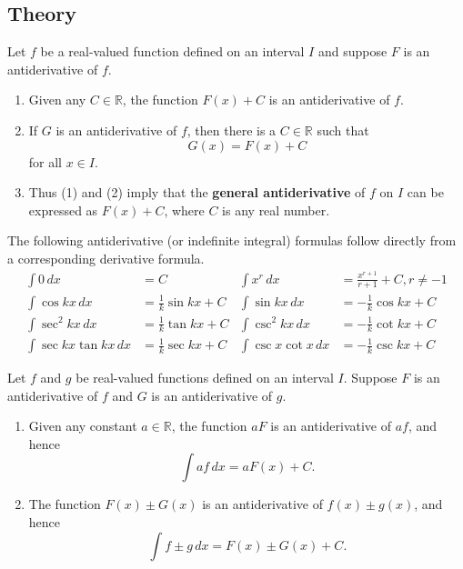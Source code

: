  \subsection*{Theory}
\begin{namedtheorem} Let $f$ be a real-valued function defined on an interval $I$ and suppose $F$ is an antiderivative of $f$.
  \begin{enumerate}[itemsep=0pt, topsep=0pt]
    \item Given any $C\in \mathbb{R}$, the function $F(x)+C$ is an antiderivative of $f$.
    \item If $G$ is an antiderivative of $f$, then there is a $C\in \mathbb{R}$ such that
    \[
    G(x)=F(x)+C
    \]
    for all $x\in I$.
    \item Thus (1) and (2) imply that the {\bf general antiderivative} of $f$ on $I$ can be expressed as $F(x)+C$, where $C$ is any real number.
  \end{enumerate}

\end{namedtheorem}
\begin{namedtheorem} The following antiderivative (or indefinite integral) formulas follow directly from a corresponding derivative formula.
  \begin{align*}
    \int 0\, dx&=C & \int x^r\, dx&=\frac{x^{r+1}}{r+1}+C, r\ne -1\\
    \int \cos kx\, dx&=\frac{1}{k}\sin kx+C & \int \sin kx\, dx &=-\frac{1}{k}\cos kx+C \\
    \int\sec^2kx\, dx&=\frac{1}{k}\tan kx+C & \int \csc^2 kx \, dx&=-\frac{1}{k}\cot kx+C\\
    \int \sec kx\tan kx\, dx&=\frac{1}{k}\sec kx+C & \int \csc x\cot x\, dx&=-\frac{1}{k}\csc kx+C
  \end{align*}
\end{namedtheorem}
\begin{namedtheorem} Let $f$ and $g$ be real-valued functions defined on an interval $I$. Suppose $F$ is an antiderivative of $f$ and $G$ is an antiderivative of $g$.
  \begin{enumerate}[itemsep=0pt, topsep=0pt]
    \item Given any constant $a\in \mathbb{R}$, the function $aF$ is an antiderivative of $af$, and hence
    \[
    \int af\, dx=aF(x)+C.
    \]
    \item The function $F(x)\pm G(x)$ is an antiderivative of $f(x)\pm g(x)$, and hence
    \[
    \int f\pm g\, dx=F(x)\pm G(x)+C.
    \]
  \end{enumerate}

\end{namedtheorem}
